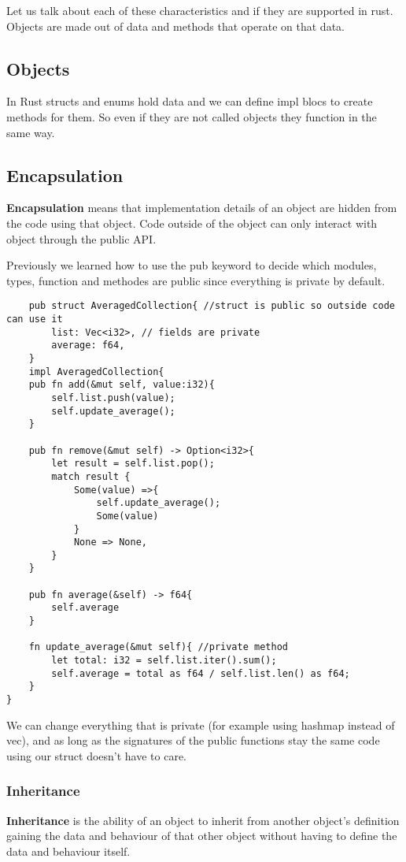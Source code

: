 Let us talk about each of these characteristics and if they are supported in rust. Objects are made out of data and methods that operate on that data. 
\subsection{Objects}
In Rust structs and enums hold data and we can define impl blocs to create methods for them. So even if they are not called objects they function in the same way.

\subsection{Encapsulation}
\begin{definition}
    \textbf{Encapsulation} means that implementation details of an object are hidden from the code using that object. Code outside of the object can only interact with object through the public API. 
\end{definition}

Previously we learned how to use the pub keyword to decide which modules, types, function and methodes are public since everything is private by default.

\begin{lstlisting}
    pub struct AveragedCollection{ //struct is public so outside code can use it
        list: Vec<i32>, // fields are private
        average: f64,
    }
    impl AveragedCollection{
    pub fn add(&mut self, value:i32){
        self.list.push(value);
        self.update_average();
    }

    pub fn remove(&mut self) -> Option<i32>{
        let result = self.list.pop();
        match result {
            Some(value) =>{
                self.update_average();
                Some(value)
            }
            None => None,
        }
    }

    pub fn average(&self) -> f64{
        self.average
    }

    fn update_average(&mut self){ //private method
        let total: i32 = self.list.iter().sum();
        self.average = total as f64 / self.list.len() as f64;
    }
}
\end{lstlisting}

We can change everything that is private (for example using hashmap instead of vec), and as long as the signatures of the public functions stay the same code using our struct doesn't have to care.
\subsubsection{Inheritance}
\begin{definition}
    \textbf{Inheritance} is the ability of an object to inherit from another object's definition gaining the data and behaviour of that other object without having to define the data and behaviour itself. 
\end{definition}

